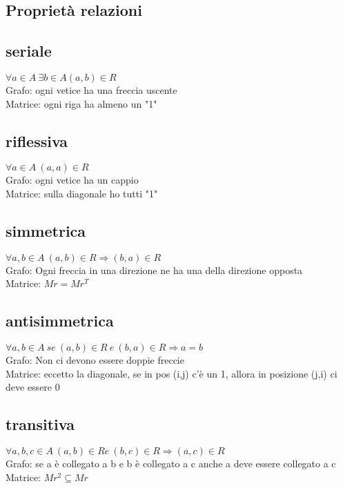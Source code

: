 \documentclass{article}
\begin{document}
		\allsectionsfont{\small}
		\scriptsize
		
		\begin{multicols*}{3}
		\section{Proprietà relazioni}
		
		\subsection{seriale}
		\(\forall a \in A \  \exists b \in A (a,b) \in R\)\\
		Grafo: ogni vetice ha una freccia uscente\\
		Matrice: ogni riga ha almeno un "1"
		\subsection{riflessiva}
		\(\forall a \in A \  (a,a) \in R\)\\
		Grafo: ogni vetice ha un cappio\\
		Matrice: sulla diagonale ho tutti "1"
		\subsection{simmetrica}
		\(\forall a,b \in A \  (a,b) \in R \Rightarrow (b,a)\in R\)\\
		Grafo: Ogni freccia in una direzione ne ha una della direzione opposta\\
		Matrice: \(Mr=Mr^T\)
		\subsection{antisimmetrica}
		\(\forall a,b \in A \  se\ (a,b) \in R \ e\  (b,a)\in R \Rightarrow a=b\)\\
		Grafo: Non ci devono essere doppie freccie\\
		Matrice: eccetto la diagonale, se in pos (i,j) c'è un 1, allora in posizione (j,i) ci deve essere 0
		\subsection{transitiva}
		\(\forall a,b,c \in A \  (a,b) \in R e\ (b,c)\in R \Rightarrow (a,c)\in R\)\\
		Grafo: se a è collegato a b e b è collegato a c anche a deve essere collegato a c \\
		Matrice: \(Mr^2\subseteq Mr\)\\
		

\end{multicols*}
\end{document}
